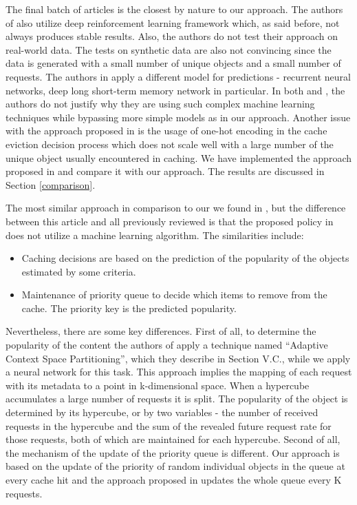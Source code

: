 The final batch of articles is the closest by nature to our approach. The authors of \cite{22} also utilize deep reinforcement learning framework which, as said before, not always produces stable results. Also, the authors do not test their approach on real-world data. The tests on synthetic data are also not convincing since the data is generated with a small number of unique objects and a small number of requests. The authors in \cite{23} apply a different model for predictions - recurrent neural networks, deep long short-term memory network in particular. In both \cite{22} and \cite{23}, the authors do not justify why they are using such complex machine learning techniques while bypassing more simple models as in our approach. Another issue with the approach proposed in \cite{23} is the usage of one-hot encoding in the cache eviction decision process which does not scale well with a large number of the unique object usually encountered in caching. We have implemented the approach proposed in \cite{23} and compare it with our approach. The results are discussed in Section \ref{comparison}. 

The most similar approach in comparison to our we found in \cite{25}, but the difference between this article and all previously reviewed is that the proposed policy in \cite{25} does not utilize a machine learning algorithm. The similarities include:
\begin{itemize}
	\item Caching decisions are based on the prediction of the popularity of the objects estimated by some criteria.
	\item Maintenance of priority queue to decide which items to remove from the cache. The priority key is the predicted popularity.
\end{itemize}
Nevertheless, there are some key differences. First of all, to determine the popularity of the content the authors of \cite{25} apply a technique named ``Adaptive Context Space Partitioning'', which they describe in Section V.C.,  while we apply a neural network for this task. This approach implies the mapping of each request with its metadata to a point in k-dimensional space. When a hypercube accumulates a large number of requests it is split. The popularity of the object is determined by its hypercube, or by two variables - the number of received requests in the hypercube and the sum of the revealed future request rate for those requests, both of which are maintained for each hypercube. Second of all, the mechanism of the update of the priority queue is different. Our approach is based on the update of the priority of random individual objects in the queue at every cache hit and the approach proposed in \cite{25} updates the whole queue every K requests.

